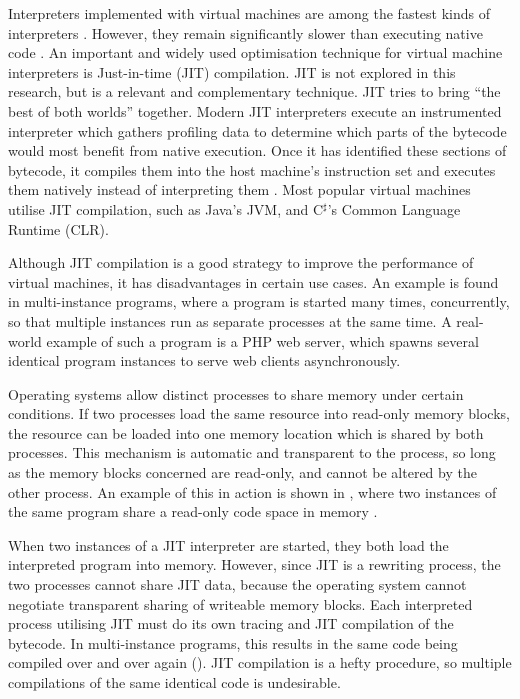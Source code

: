 		Interpreters implemented with virtual machines are among the fastest kinds of interpreters \citep{modernarchvm}. However, they remain significantly slower than executing native code \citep{optimizingindirectbranch}. An important and widely used optimisation technique for virtual machine interpreters is Just-in-time (JIT) compilation. JIT is not explored in this research, but is a relevant and complementary technique. JIT tries to bring ``the best of both worlds'' together. Modern JIT interpreters execute an instrumented interpreter which gathers profiling data to determine which parts of the bytecode would most benefit from native execution. Once it has identified these sections of bytecode, it compiles them into the host machine's instruction set and executes them natively instead of interpreting them \citep{historyjit}. Most popular virtual machines utilise JIT compilation, such as Java's JVM, and C$^\sharp$'s Common Language Runtime (CLR).
		
		Although JIT compilation is a good strategy to improve the performance of virtual machines, it has disadvantages in certain use cases. An example is found in multi-instance programs, where a program is started many times, concurrently, so that multiple instances run as separate processes at the same time. A real-world example of such a program is a PHP web server, which spawns several identical program instances to serve web clients asynchronously.
		
		Operating systems allow distinct processes to share memory under certain conditions. If two processes load the same resource into read-only memory blocks, the resource can be loaded into one memory location which is shared by both processes. This mechanism is automatic and transparent to the process, so long as the memory blocks concerned are read-only, and cannot be altered by the other process. An example of this in action is shown in , where two instances of the same program share a read-only code space in memory \citep{sharedcodepatent}. 
		
		When two instances of a JIT interpreter are started, they both load the interpreted program into memory. However, since JIT is a rewriting process, the two processes cannot share JIT data, because the operating system cannot negotiate transparent sharing of writeable memory blocks. Each interpreted process utilising JIT must do its own tracing and JIT compilation of the bytecode. In multi-instance programs, this results in the same code being compiled over and over again (). JIT compilation is a hefty procedure, so multiple compilations of the same identical code is undesirable. 
		
